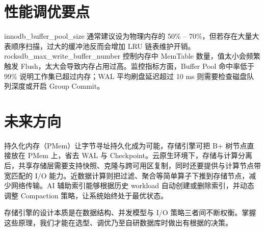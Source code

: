 \chapter{性能调优要点}
innodb\_{}buffer\_{}pool\_{}size 通常建议设为物理内存的 50\%{} – 70\%{}，但若存在大量大表顺序扫描，过大的缓冲池反而会增加 LRU 链表维护开销。rocksdb\_{}max\_{}write\_{}buffer\_{}number 控制内存中 MemTable 数量，值太小会频繁触发 Flush，太大会导致内存占用过高。监控指标方面，Buffer Pool 命中率低于 99\%{} 说明工作集已超过内存；WAL 平均刷盘延迟超过 10 ms 则需要检查磁盘队列深度或开启 Group Commit。\par
\chapter{未来方向}
持久化内存（PMem）让字节寻址持久化成为可能，存储引擎可把 B+ 树节点直接放在 PMem 上，省去 WAL 与 Checkpoint。云原生环境下，存储与计算分离后，共享存储层需要支持快照、克隆与跨可用区复制，同时还要提供与计算节点带宽匹配的 I/O 能力。近数据计算则把过滤、聚合等简单算子下推到存储节点，减少网络传输。AI 辅助索引能够根据历史 workload 自动创建或删除索引，并动态调整 Compaction 策略，让系统始终处于最优状态。\par
存储引擎的设计本质是在数据结构、并发模型与 I/O 策略三者间不断权衡。掌握这些原理，我们才能在选型、调优乃至自研数据库时做出有根据的决策。\par
